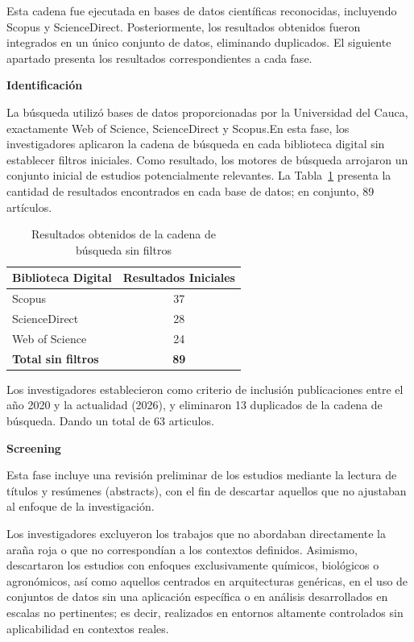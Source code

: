 \documentclass[12pt,letterpaper]{article}
\begin{document}
Esta cadena fue ejecutada en bases de datos científicas reconocidas, incluyendo Scopus y ScienceDirect. Posteriormente, los resultados obtenidos fueron integrados en un único conjunto de datos, eliminando duplicados. El siguiente apartado presenta los resultados correspondientes a cada fase.

\textbf{Identificación}

La búsqueda utilizó bases de datos proporcionadas por la Universidad del Cauca, exactamente Web of Science, ScienceDirect y Scopus.En esta fase, los investigadores aplicaron la cadena de búsqueda en cada biblioteca digital sin establecer filtros iniciales. Como resultado, los motores de búsqueda arrojaron un conjunto inicial de estudios potencialmente relevantes. La Tabla~\ref{tab:sin_filtros} presenta la cantidad de resultados encontrados en cada base de datos; en conjunto,  89 artículos.

\begin{table}[H]
\centering
\caption{Resultados obtenidos de la cadena de búsqueda sin filtros}
\label{tab:sin_filtros}
\begin{tabular}{l c}
\toprule
\textbf{Biblioteca Digital} & \textbf{Resultados Iniciales} \\
\midrule
Scopus & 37 \\
ScienceDirect & 28 \\
Web of Science & 24 \\
\midrule
\textbf{Total sin filtros} & \textbf{89} \\
\bottomrule
\end{tabular}
\end{table}

Los investigadores establecieron como criterio de inclusión publicaciones entre el año 2020 y la actualidad (2026), y eliminaron 13 duplicados de la cadena de búsqueda. Dando un total de 63  articulos.

\textbf{Screening}

Esta fase incluye una revisión preliminar de los estudios mediante la lectura de títulos y resúmenes (abstracts), con el fin de descartar aquellos que no ajustaban al enfoque de la investigación.

Los investigadores excluyeron los trabajos que no abordaban directamente la araña roja o que no correspondían a los contextos definidos. Asimismo, descartaron los estudios con enfoques exclusivamente químicos, biológicos o agronómicos, así como aquellos centrados en arquitecturas genéricas, en el uso de conjuntos de datos sin una aplicación específica o en análisis desarrollados en escalas no pertinentes; es decir, realizados en entornos altamente controlados sin aplicabilidad en contextos reales.
\end{document}
